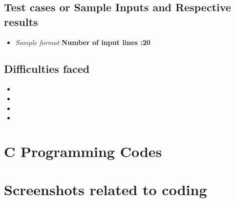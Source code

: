 \documentclass[10pt]{article}
\begin{document}
\subsection{Test cases or Sample Inputs and Respective results}
\begin{itemize}
	\item \textit{Sample format}
	\subitem \textbf{Number of input lines :20}
	\subitem 
	\subitem 
\end{itemize}

\subsection{Difficulties faced}
\begin{itemize}
	\item 
	\item 
	\item 
	\item
\end{itemize}

\newpage

\section{\textbf{\large C Programming Codes}}
%
%

\section{\textbf{\large Screenshots related to coding}}

\newpage

 
\end{document}
